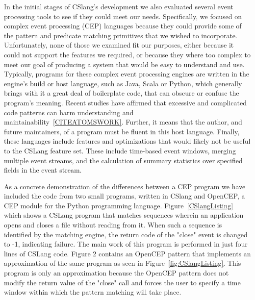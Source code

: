 In the initial stages of CSlang's development we also
evaluated several event processing tools to see if
they could meet our needs.
Specifically,
we focused on
complex event processing (CEP) languages because they
could
provide some of the pattern and predicate matching primitives
that we wished to
incorporate.
Unfortunately,
none of those we examined fit our purposes,
either because it could not support the features
we required, or because they where too complex
to meet our
goal of producing a system
that would be easy to understand and use.
Typically,
programs for these complex event processing engines are
written in the engine's build or host language,
such as Java,
Scala or
Python,
which generally brings with it a great deal of boilerplate code,
that can obscure or confuse
the program's meaning.
Recent studies
have affirmed that excessive and complicated code
patterns can harm
understanding and
maintainability~\ref{CITEATOMSWORK}.
Further,
it means that the author,
and future maintainers,
of a
program must be fluent in this host language.
Finally,
these languages include features and optimizations
that would likely not be useful to the CSLang feature set.
These include time-based event windows,
merging multiple event streams,
and the calculation of
summary statistics over specified fields in the event stream.

As a concrete demonstration of the differences between a CEP
program we have included the code from two small programs, written in
CSlang and OpenCEP, a CEP module for the Python programming language.
Figure~\ref{CSlangListing}
which shows a CSLang program that matches sequences wherein an
application opens and closes a file without reading from it. When such a
sequence is identified by the matching engine, the return code of the
"close" event is changed to -1, indicating failure.
The main work of this
program is performed in just four lines of CSLang code.  Figure 2 contains
an OpenCEP\cite{open_cep_website} pattern that implements an approximation
of the same program as seen in Figure~\ref{fig:CSlangListing}.
This program is only
an approximation because the OpenCEP pattern does not modify the return
value of the "close" call and forces the user to specify a time window
within which the pattern matching will take place.





